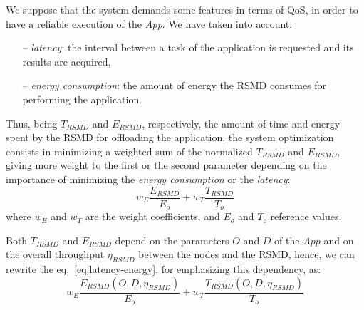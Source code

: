 \documentclass[twoside,openright]{report}
\begin{document}
We suppose that the system demands some features in terms of \gls{QoS}, in order to have a reliable execution of the \textit{App}. We have taken into account:
\begin{itemize}
\item[--] \emph{latency}: the interval between a task of the application is requested and its results are acquired,
\item[--] \emph{energy consumption}: the amount of energy the \gls{RSMD} consumes for performing the application.
\end{itemize}
Thus, being $T_{\textit{RSMD}}$ and $E_{\textit{RSMD}}$, respectively, the amount of time and energy spent by the \gls{RSMD} for offloading the application, the system optimization consists in minimizing a weighted sum of the normalized $T_\textit{RSMD}$ and $E_\textit{RSMD}$, giving more weight to the first or the second parameter depending on the importance of minimizing the \emph{energy consumption} or the \emph{latency}:
%
\begin{equation}
\label{eq:latency-energy}
w_E \frac{E_\textit{RSMD}}{E_o} + w_T  \frac{T_\textit{RSMD}}{T_o}  
\end{equation}
where $w_E$ and $w_T$ are the weight coefficients, and $E_o$ and $T_o$ reference values.

Both $T_\textit{RSMD}$ and $E_\textit{RSMD}$ depend on the parameters $O$ and $D$ of the $App$ and on the overall throughput $\eta_\textit{RSMD}$ between the nodes and the \gls{RSMD}, hence, we can rewrite the eq.~\eqref{eq:latency-energy}, for emphasizing this dependency, as:
\begin{equation}
\label{eq:latency-energy2}
w_E \frac{E_\textit{RSMD}(O,D,\eta_\textit{RSMD})}{E_o} + w_T  \frac{T_\textit{RSMD}(O,D,\eta_\textit{RSMD})}{T_o}  
\end{equation}
\end{document}
